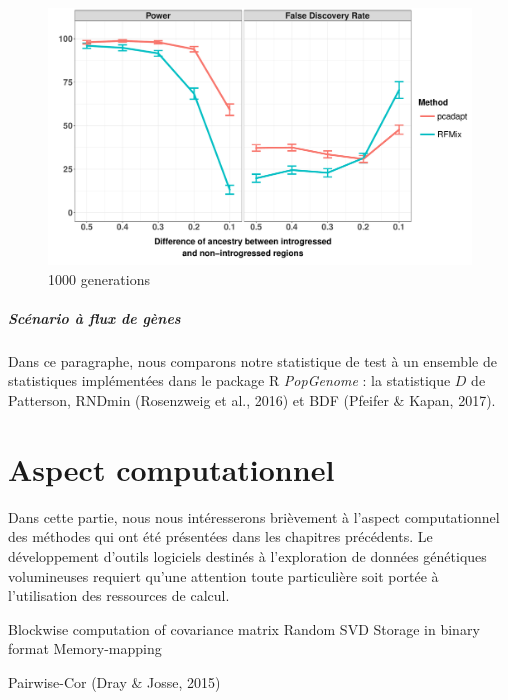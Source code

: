 \documentclass[12pt,twoside]{reedthesis}
\begin{document}
  \begin{figure}
  
  {\centering \includegraphics[width=500px]{figure/facet_admixture_setting_1000_gen} 
  
  }
  
  \caption{1000 generations}\label{fig:ras1000g}
  \end{figure}
  
  \paragraph{Scénario à flux de gènes}\label{scenario-a-flux-de-genes-1}
  
  Dans ce paragraphe, nous comparons notre statistique de test à un
  ensemble de statistiques implémentées dans le package R \emph{PopGenome}
  : la statistique \(D\) de Patterson, RNDmin (Rosenzweig et al., 2016) et
  BDF (Pfeifer \& Kapan, 2017).
  
  \chapter{Aspect computationnel}\label{aspect-computationnel}
  
  Dans cette partie, nous nous intéresserons brièvement à l'aspect
  computationnel des méthodes qui ont été présentées dans les chapitres
  précédents. Le développement d'outils logiciels destinés à l'exploration
  de données génétiques volumineuses requiert qu'une attention toute
  particulière soit portée à l'utilisation des ressources de calcul.
  
  Blockwise computation of covariance matrix Random SVD Storage in binary
  format Memory-mapping
  
  Pairwise-Cor (Dray \& Josse, 2015)
  
\end{document}
